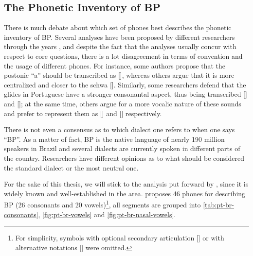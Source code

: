 \subsection{The Phonetic Inventory of \gls{BP}} 

There is much debate about which set of phones best describes the phonetic inventory of \gls{BP}. Several analyses have been proposed by different researchers through the years \cite{Bisol2005, Cagliari2002, Camara1970, Cristofaro2005, Neves1999}, and despite the fact that the analyses usually concur with respect to core questions, there is a lot disagreement in terms of convention and the usage of different phones.  For instance, some authors propose that the postonic ``a'' should be transcribed as [], whereas others argue that it is more centralized and closer to the schwa []. Similarly, some researchers defend that the glides in Portuguese have a stronger consonantal aspect, thus being transcribed [] and []; at the same time, others argue for a more vocalic nature of these sounds and prefer to represent them as [] and [] respectively. 

There is not even a consensus as to which dialect one refers to when one says ``\gls{BP}''. As a matter of fact, \gls{BP} is the native language of nearly 190 million speakers in Brazil \cite{Ethnologue2005} and several dialects are currently spoken in different parts of the country. Researchers have different opinions as to what should be considered the standard dialect or the most neutral one.

For the sake of this thesis, we will stick to the analysis put forward by \citeauthor{Cristofaro2005}, since it is widely known and well-established in the area. \citeauthor{Cristofaro2005} proposes 46 phones for describing \gls{BP} (26 consonants and 20 vowels)\footnote{For simplicity, symbols with optional secondary articulation [] or with alternative notations [] were omitted.}, all segments are grouped into \autoref{tab:pt-br-consonants}, \autoref{fig:pt-br-vowels} and \autoref{fig:pt-br-nasal-vowels}.

